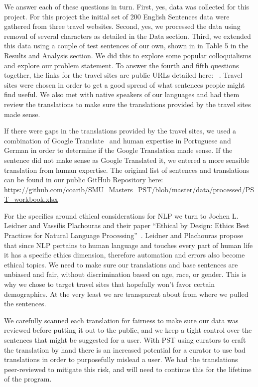 \documentclass[runningheads]{llncs}
\begin{document}
We answer each of these questions in turn. First, yes, data was collected for this project. For this project the initial set of 200 English Sentences data were gathered from three travel websites. Second, yes, we processed the data using removal of several characters as detailed in the Data section. Third, we extended this data using a couple of test sentences of our own, shown in in Table 5 in the Results and Analysis section. We did this to explore some popular colloquialisms and explore our problem statement. To answer the fourth and fifth questions together, the links for the travel sites are public URLs detailed here: ~\cite{ref_url11,ref_url12,ref_url13}. Travel sites were chosen in order to get a good spread of what sentences people might find useful. We also met with native speakers of our languages and had them review the translations to make sure the translations provided by the travel sites made sense. 

If there were gaps in the translations provided by the travel sites, we used a combination of Google Translate~\cite{ref_url14} and human expertise in Portuguese and German in order to determine if the Google Translation made sense. If the sentence did not make sense as Google Translated it, we entered a more sensible translation from human expertise. The original list of sentences and translations can be found in our public GitHub Repository here:
\url{https://github.com/coarib/SMU_Masters_PST/blob/master/data/processed/PST_workbook.xlsx}

For the specifics around ethical considerations for NLP we turn to Jochen L. Leidner and Vassilis Plachouras and their paper ``Ethical by Design: Ethics Best Practices for Natural Language Processing''~\cite{ref_url15}.  Leidner and Plachouras propose that since NLP pertains to human language and touches every part of human life it has a specific ethics dimension, therefore automation and errors also become ethical topics. We need to make sure our translations and base sentences are unbiased and fair, without discrimination based on age, race, or gender. This is why we chose to target travel sites that hopefully won't favor certain demographics. At the very least we are transparent about from where we pulled the sentences.

We carefully scanned each translation for fairness to make sure our data was reviewed before putting it out to the public, and we keep a tight control over the sentences that might be suggested for a user. With PST using curators to craft the translation by hand there is an increased potential for a curator to use bad translations in order to purposefully mislead a user. We had the translations peer-reviewed to mitigate this risk, and will need to continue this for the lifetime of the program.
\end{document}
